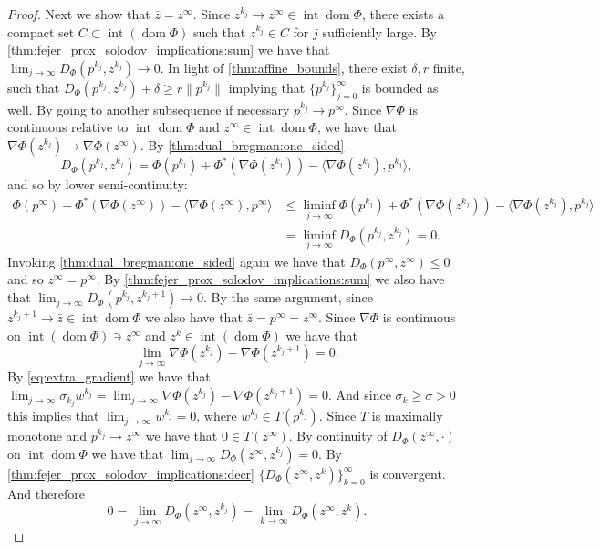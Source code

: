\documentclass[11pt,onecolumn]{article}
\DeclareMathOperator{\dom}{dom}
\DeclareMathOperator{\intr}{int}
\theoremstyle{remark}
\begin{document}
\begin{proof}
Next we show that $\bar z = z^\infty$. Since $z^{k_j} \to z^\infty \in \intr\dom \Phi$, there exists a compact set $C \subset \intr (\dom \Phi)$ such that $z^{k_j} \in C$ for $j$ sufficiently large. By \cref{thm:fejer_prox_solodov_implications:sum} we have that $\lim_{j \to \infty} D_\Phi(p^{k_j}, z^{k_j}) \to 0$. In light of \cref{thm:affine_bounds}, there exist $\delta, r$ finite, such that $D_\Phi(p^{k_j}, z^{k_j}) +\delta \geq r\|p^{k_j}\|$ implying that $\{p^{k_j}\}_{j=0}^\infty$ is bounded as well. By going to another subsequence if necessary $p^{k_j} \to p^\infty$. Since $\nabla \Phi$ is continuous relative to $\intr \dom \Phi$ and $z^\infty\in \intr \dom \Phi$, we have that $\nabla \Phi(z^{k_j}) \to \nabla \Phi(z^\infty)$. By \cref{thm:dual_bregman:one_sided} 
$$
D_\Phi(p^{k_j}, z^{k_j}) = \Phi(p^{k_j}) + \Phi^*(\nabla \Phi(z^{k_j})) - \langle \nabla \Phi(z^{k_j}), p^{k_j} \rangle,
$$
and so by lower semi-continuity:
\begin{align*}
\Phi(p^{\infty}) + \Phi^*(\nabla \Phi(z^{\infty})) - \langle \nabla \Phi(z^{\infty}), p^{\infty} \rangle &\leq \liminf_{j\to \infty} \Phi(p^{k_j}) + \Phi^*(\nabla \Phi(z^{k_j})) - \langle \nabla \Phi(z^{k_j}), p^{k_j} \rangle \\
&=\liminf_{j\to \infty} D_\Phi(p^{k_j}, z^{k_j}) = 0.
\end{align*}
Invoking \cref{thm:dual_bregman:one_sided} again we have that $D_\Phi(p^{\infty}, z^{\infty}) \leq 0$ and so $z^\infty=p^\infty$.
By \cref{thm:fejer_prox_solodov_implications:sum} we also have that $\lim_{j \to \infty} D_\Phi(p^{k_j}, z^{k_j+1}) \to 0$. By the same argument, since $z^{k_j+1}\to \bar z \in \intr \dom \Phi$ we also have that $\bar z=p^\infty=z^\infty$.
Since $\nabla \Phi$ is continuous on $\intr (\dom \Phi)\ni z^\infty$ and $z^k \in \intr (\dom \Phi)$ we have that
$$
\lim_{j \to \infty} \nabla \Phi(z^{k_j})-\nabla \Phi(z^{k_j+1}) = 0.
$$
By \cref{eq:extra_gradient} we have that $\lim_{j \to \infty} \sigma_{k_j} w^{k_j} = \lim_{j \to \infty} \nabla \Phi(z^{k_j})-\nabla \Phi(z^{k_j+1})=0$. And since $\sigma_k \geq \sigma > 0$ this implies that $\lim_{j \to \infty} w^{k_j} = 0$, where $w^{k_j} \in T(p^{k_j})$. Since $T$ is maximally monotone and $p^{k_j} \to z^\infty$ we have that $0 \in T(z^\infty)$. By continuity of $D_\Phi(z^\infty, \cdot)$ on $\intr \dom \Phi$ we have that $\lim_{j \to \infty} D_\Phi(z^\infty, z^{k_j}) = 0$. By \cref{thm:fejer_prox_solodov_implications:decr} $\{D_\Phi(z^\infty, z^{k})\}_{k=0}^\infty$ is convergent. And therefore 
$$
0=\lim_{j \to \infty} D_\Phi(z^\infty, z^{k_j}) = \lim_{k \to \infty} D_\Phi(z^\infty, z^{k}).
$$
\end{proof}
\end{document}
